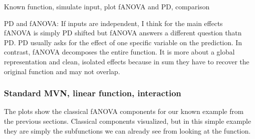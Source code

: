 Known function, simulate input, plot fANOVA and PD, comparison

PD and fANOVA: If inputs are independent, I think for the main effects fANOVA is simply PD shifted but fANOVA answers a different question thatn PD. PD usually asks for the effect of one specific variable on the prediction. In contrast, fANOVA decomposes the entire function. It is more about a global representation and clean, isolated effects because in sum they have to recover the original function and may not overlap.

\subsubsection*{Standard MVN, linear function, interaction}

The plots show the classical fANOVA components for our known example from the previous sections. Classical components visualized, but in this simple example they are simply the subfunctions we can already see from looking at the function.

